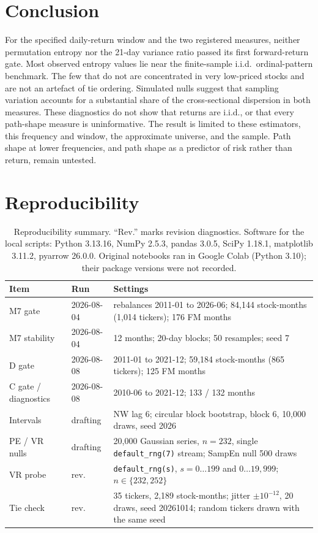 \documentclass[11pt]{article}
\begin{document}
\section{Conclusion}

For the specified daily-return window and the two registered measures, neither
permutation entropy nor the 21-day variance ratio passed its first forward-return gate.
Most observed entropy values lie near the finite-sample i.i.d.\ ordinal-pattern benchmark.
The few that do not are concentrated in very low-priced stocks and are not an artefact of
tie ordering. Simulated nulls suggest that sampling variation accounts for a substantial
share of the cross-sectional dispersion in both measures. These diagnostics do not show that
returns are i.i.d., or that every path-shape measure is uninformative. The result is
limited to these estimators, this frequency and window, the approximate universe, and the
sample. Path shape at lower frequencies, and path shape as a predictor of risk rather than
return, remain untested.

\section{Reproducibility}
\label{sec:repro}

\begin{table}[h]
\centering\footnotesize
\caption{Reproducibility summary. ``Rev.'' marks revision diagnostics. Software for the
local scripts: Python 3.13.16, NumPy 2.5.3, pandas 3.0.5, SciPy 1.18.1, matplotlib 3.11.2,
pyarrow 26.0.0. Original notebooks ran in Google Colab (Python 3.10); their package
versions were not recorded.}
\label{tab:repro}
\begin{tabularx}{\textwidth}{@{}l l X@{}}
\toprule
Item & Run & Settings \\
\midrule
M7 gate & 2026-08-04 & rebalances 2011-01 to 2026-06; 84,144 stock-months (1,014 tickers); 176 FM months \\
M7 stability & 2026-08-04 & 12 months; 20-day blocks; 50 resamples; seed 7 \\
D gate & 2026-08-08 & 2011-01 to 2021-12; 59,184 stock-months (865 tickers); 125 FM months \\
C gate / diagnostics & 2026-08-08 & 2010-06 to 2021-12; 133 / 132 months \\
Intervals & drafting & NW lag 6; circular block bootstrap, block 6, 10,000 draws, seed 2026 \\
PE / VR nulls & drafting & 20,000 Gaussian series, $n=232$, single \texttt{default\_rng(7)} stream; SampEn null 500 draws \\
VR probe & rev. & \texttt{default\_rng(s)}, $s=0\ldots199$ and $0\ldots19{,}999$; $n\in\{232,252\}$ \\
Tie check & rev. & 35 tickers, 2,189 stock-months; jitter $\pm10^{-12}$, 20 draws, seed 20261014; random tickers drawn with the same seed \\
\bottomrule
\end{tabularx}
\end{table}
\end{document}
